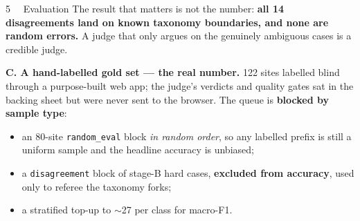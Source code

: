 \documentclass[final]{beamer}
\newcommand{\ttx}[1]{\texttt{#1}}
\newlength{\colw}
\begin{document}
\begin{frame}[t]{}
\begin{minipage}[t]{\colw}
\begin{pblock}{5 \ \ Evaluation}
\smallskip
The result that matters is not the number: \textbf{all 14 disagreements land on known
taxonomy boundaries, and none are random errors.} A judge that only argues on the
genuinely ambiguous cases is a credible judge.

\medskip
\textbf{C. A hand-labelled gold set --- the real number.} 122 sites labelled blind through
a purpose-built web app; the judge's verdicts and quality gates sat in the backing sheet
but were never sent to the browser. The queue is \textbf{blocked by sample type}:

\smallskip
\begin{itemize}\itemsep5pt
\item[--] an 80-site \ttx{random\_eval} block \emph{in random order}, so any labelled
  prefix is still a uniform sample and the headline accuracy is unbiased;
\item[--] a \ttx{disagreement} block of stage-B hard cases, \textbf{excluded from
  accuracy}, used only to referee the taxonomy forks;
\item[--] a stratified top-up to $\sim$27 per class for macro-F1.
\end{itemize}

\medskip
\begin{center}
\end{center}


\end{pblock}
\end{minipage}
\end{frame}
\end{document}
